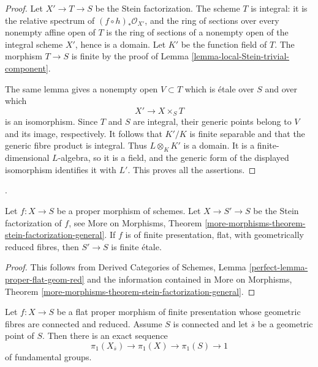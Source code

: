 \begin{proof}
Let $X' \to T \to S$ be the Stein factorization. The scheme $T$ is integral:
it is the relative spectrum of $(f \circ h)_*\mathcal{O}_{X'}$, and the ring
of sections over every nonempty affine open of $T$ is the ring of sections of
a nonempty open of the integral scheme $X'$, hence is a domain. Let $K'$ be
the function field of $T$. The morphism $T \to S$ is finite by the proof of
Lemma \ref{lemma-local-Stein-trivial-component}.

\medskip\noindent
The same lemma gives a nonempty open $V \subset T$ which is \'etale over $S$
and over which
$$
X' \longrightarrow X \times_S T
$$
is an isomorphism. Since $T$ and $S$ are integral, their generic points belong
to $V$ and its image, respectively. It follows that $K'/K$ is finite separable
and that the generic fibre product is integral. Thus $L \otimes_K K'$ is a domain. It is a
finite-dimensional $L$-algebra, so it is a field, and the generic form of the
displayed isomorphism identifies it with $L'$. This proves all the assertions.
\end{proof}

\begin{lemma}
\label{lemma-stein-factorization-etale}
\begin{reference}
\cite[Expose X, Proposition 1.2, p. 262]{SGA1}.
\end{reference}
Let $f : X \to S$ be a proper morphism of schemes.
Let $X \to S' \to S$ be the Stein factorization of $f$, see
More on Morphisms, Theorem
\ref{more-morphisms-theorem-stein-factorization-general}.
If $f$ is of finite presentation, flat, with geometrically
reduced fibres, then $S' \to S$ is finite \'etale.
\end{lemma}

\begin{proof}
This follows from Derived Categories of Schemes,
Lemma \ref{perfect-lemma-proper-flat-geom-red}
and the information contained in
More on Morphisms, Theorem
\ref{more-morphisms-theorem-stein-factorization-general}.
\end{proof}

\begin{proposition}
\label{proposition-first-homotopy-sequence}
Let $f : X \to S$ be a flat proper morphism of finite presentation whose
geometric fibres are connected and reduced. Assume $S$ is connected and
let $\overline{s}$ be a geometric point of $S$. Then there is an exact
sequence
$$
\pi_1(X_{\overline{s}}) \to \pi_1(X) \to \pi_1(S) \to 1
$$
of fundamental groups.
\end{proposition}

